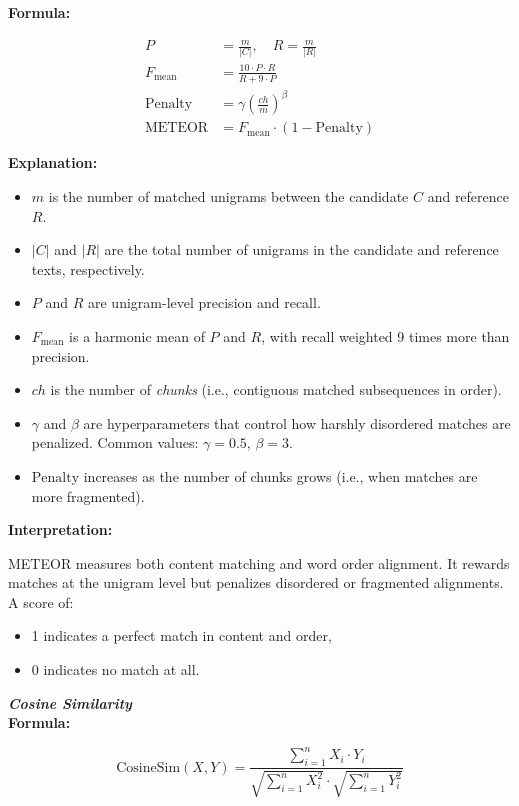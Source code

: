 \documentclass[conference]{IEEEtran}
\begin{document}
\textbf{Formula:}

\begin{align}
P &= \frac{m}{|C|}, \quad R = \frac{m}{|R|} \\
F_{\text{mean}} &= \frac{10 \cdot P \cdot R}{R + 9 \cdot P} \\
\text{Penalty} &= \gamma \left( \frac{ch}{m} \right)^\beta \\
\text{METEOR} &= F_{\text{mean}} \cdot (1 - \text{Penalty})
\end{align}

\textbf{Explanation:}
\begin{itemize}
  \item $m$ is the number of matched unigrams between the candidate $C$ and reference $R$.
  \item $|C|$ and $|R|$ are the total number of unigrams in the candidate and reference texts, respectively.
  \item $P$ and $R$ are unigram-level precision and recall.
  \item $F_{\text{mean}}$ is a harmonic mean of $P$ and $R$, with recall weighted 9 times more than precision.
  \item $ch$ is the number of \textit{chunks} (i.e., contiguous matched subsequences in order).
  \item $\gamma$ and $\beta$ are hyperparameters that control how harshly disordered matches are penalized. Common values: $\gamma = 0.5$, $\beta = 3$.
  \item $\text{Penalty}$ increases as the number of chunks grows (i.e., when matches are more fragmented).
\end{itemize}

\textbf{Interpretation:}

METEOR measures both content matching and word order alignment. It rewards matches at the unigram level but penalizes disordered or fragmented alignments. A score of:
\begin{itemize}
  \item 1 indicates a perfect match in content and order,
  \item 0 indicates no match at all.
\end{itemize}
\vspace{1em}
\noindent \textbf{\textit{Cosine Similarity}}\\

\textbf{Formula:}

\begin{equation}
\text{CosineSim}(X, Y) = \frac{\sum_{i=1}^{n} X_i \cdot Y_i}{\sqrt{\sum_{i=1}^{n} X_i^2} \cdot \sqrt{\sum_{i=1}^{n} Y_i^2}}
\end{equation}
\end{document}
